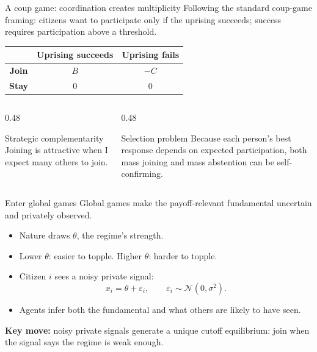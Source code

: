 \documentclass[aspectratio=169,12pt]{beamer}
\newcommand{\hl}[1]{{\color{accent}\textbf{#1}}}
\begin{document}
\begin{frame}{A coup game: coordination creates multiplicity}
  \normalsize
  Following the standard coup-game framing: citizens want to participate only if the uprising succeeds; success requires participation above a threshold.

  \medskip
  \centering
  \renewcommand{\arraystretch}{1.18}
  \begin{tabular}{c|cc}
    & \textbf{Uprising succeeds} & \textbf{Uprising fails} \\
    \hline
    \textbf{Join} & $B$ & $-C$ \\
    \textbf{Stay} & $0$ & $0$ \\
  \end{tabular}

  \medskip
  \begin{columns}[T]
    \begin{column}{0.48\textwidth}
      \begin{block}{Strategic complementarity}
        \small Joining is attractive when I expect many others to join.
      \end{block}
    \end{column}
    \begin{column}{0.48\textwidth}
      \begin{alertblock}{Selection problem}
        \small Because each person's best response depends on expected participation, both mass joining and mass abstention can be self-confirming.
      \end{alertblock}
    \end{column}
  \end{columns}
\end{frame}

\begin{frame}{Enter global games}
  \normalsize
  Global games make the payoff-relevant fundamental uncertain and privately observed.

  \medskip
  \begin{itemize}\setlength\itemsep{0.35em}
    \item Nature draws \hl{$\theta$}, the regime's strength.
    \item Lower $\theta$: easier to topple. Higher $\theta$: harder to topple.
    \item Citizen $i$ sees a noisy private signal:
      \[
        x_i=\theta+\varepsilon_i,\qquad \varepsilon_i\sim\mathcal N(0,\sigma^2).
      \]
    \item Agents infer both the fundamental and what others are likely to have seen.
  \end{itemize}

  \smallskip
  {\small\color{muted}\textbf{Key move:} noisy private signals generate a unique cutoff equilibrium: join when the signal says the regime is weak enough.}
\end{frame}
\end{document}
